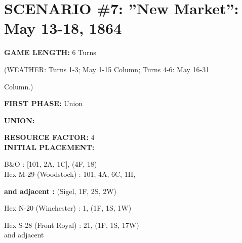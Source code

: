 \section{SCENARIO \#7: ''New Market'': May 13-18, 1864
}


\begin{scenariodata}
\textbf{GAME LENGTH:} 6 Turns\\
\end{scenariodata}

\begin{scenariodata}
(WEATHER: Turns 1-3; May 1-15 Column; Turns 4-6: May 16-31\\
\end{scenariodata}

Column.)

\begin{scenariodata}
\textbf{FIRST PHASE:} Union\\
\end{scenariodata}

\begin{scenariodata}
\textbf{UNION:}\\
\end{scenariodata}

\begin{scenariodata}
\textbf{RESOURCE FACTOR:} 4\\
\textbf{INITIAL PLACEMENT:}\\
\end{scenariodata}

\begin{scenariodata}
B\&O : [101, 2A, 1C], (4F, 18)\\
Hex M-29 (Woodstock) : 101, 4A, 6C, 1H,\\
\end{scenariodata}

\begin{scenariodata}
\textbf{and adjacent :} (Sigel, 1F, 2S, 2W)\\
\end{scenariodata}

\begin{scenariodata}
Hex N-20 (Winchester) : 1, (1F, 1S, 1W)\\
\end{scenariodata}

\begin{scenariodata}
Hex S-28 (Front Royal) : 21, (1F, 1S, 17W)\\
and adjacent\\
\end{scenariodata}


